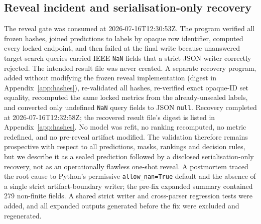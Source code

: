 \documentclass[11pt,a4paper]{article}
\begin{document}
\subsection{Reveal incident and serialisation-only recovery}
\label{sec:incident}
The reveal gate was consumed at 2026-07-16T12:30:53Z. The program verified all
frozen hashes, joined predictions to labels by opaque row identifier, computed
every locked endpoint, and then failed at the final write because unanswered
target-search queries carried IEEE \texttt{NaN} fields that a strict JSON
writer correctly rejected. The intended result file was never created. A
separate recovery program, added without modifying the frozen reveal
implementation (digest in Appendix~\ref{app:hashes}), re-validated all hashes,
re-verified exact opaque-ID set equality, recomputed the same locked metrics
from the already-unsealed labels, and converted only undefined \texttt{NaN}
query fields to JSON \texttt{null}. Recovery completed at 2026-07-16T12:32:58Z;
the recovered result file's digest is listed in Appendix~\ref{app:hashes}. No model
was refit, no ranking recomputed, no metric redefined, and no pre-reveal
artifact modified. The validation therefore remains prospective with respect
to all predictions, masks, rankings and decision rules, but we describe it as
a sealed prediction followed by a disclosed serialisation-only recovery, not
as an operationally flawless one-shot reveal. A postmortem traced the root
cause to Python's permissive \texttt{allow\_nan=True} default and the absence
of a single strict artifact-boundary writer; the pre-fix expanded summary
contained 279 non-finite fields. A shared strict writer and cross-parser
regression tests were added, and all expanded outputs generated before the fix
were excluded and regenerated.
\end{document}
